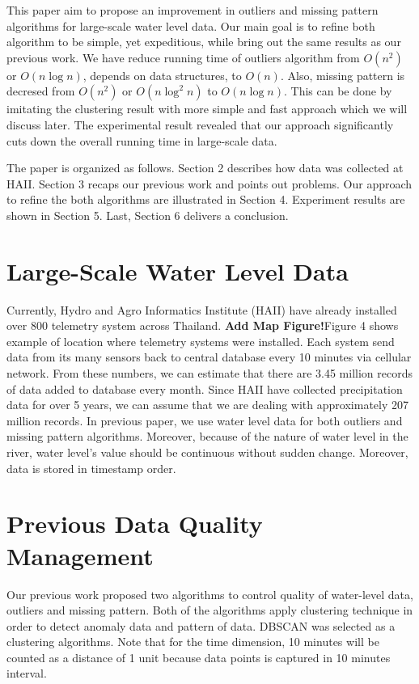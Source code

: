 \documentclass[conference]{IEEEtran}
\begin{document}
This paper aim to propose an improvement in outliers and missing pattern algorithms for large-scale water level data. Our main goal is to refine both algorithm to be simple, yet expeditious, while bring out the same results as our previous work. We have reduce running time of outliers algorithm from $O(n^2)$ or $O(n \log{n})$, depends on data structures, to $O(n)$. Also, missing pattern is decresed from $O(n^2)$ or $O(n \log^2{n})$ to $O(n \log{n})$. This can be  done by imitating the clustering result with more simple and fast approach which we will discuss later. The experimental result revealed that our approach significantly cuts down the overall running time in large-scale data.

The paper is organized as follows. Section 2 describes how data was collected at HAII. Section 3 recaps our previous work and points out problems. Our approach to refine the both algorithms are illustrated in Section 4. Experiment results are shown in Section 5. Last, Section 6 delivers a conclusion.

\section{Large-Scale Water Level Data}

Currently, Hydro and Agro Informatics Institute (HAII) have already installed over 800 telemetry system across Thailand. \textbf{\color{red}Add Map Figure!}Figure 4 shows example of location where telemetry systems were installed. Each system send data from its many sensors back to central database every 10 minutes via cellular network. From these numbers, we can estimate that there are 3.45 million records of data added to database every month. Since HAII have collected precipitation data for over 5 years, we can assume that we are dealing with approximately 207 million records. In previous paper, we use water level data for both outliers and missing pattern algorithms. Moreover, because of the nature of water level in the river, water level's value should be continuous without sudden change. Moreover, data is stored in timestamp order.

\section{Previous Data Quality Management}

Our previous work proposed two algorithms to control quality of water-level data, outliers and missing pattern. Both of the algorithms apply clustering technique in order to detect anomaly data and pattern of data. DBSCAN was selected as a clustering algorithms. Note that for the time dimension, 10 minutes will be counted as a distance of 1 unit because data points is captured in 10 minutes interval.
\end{document}
